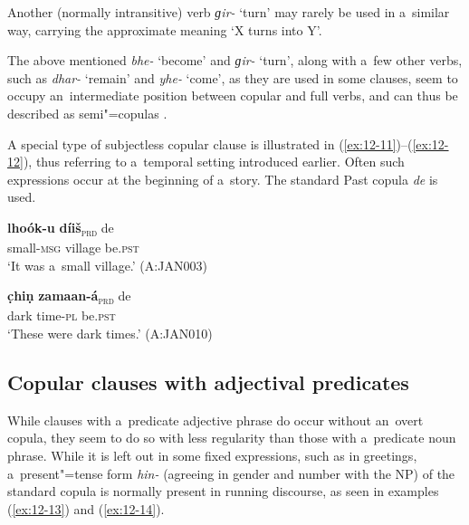 Another (normally intransitive) verb \textit{ɡir-} `turn' may rarely be used in a~similar way, carrying the approximate meaning `X turns into Y'.



The above mentioned \textit{bhe-} `become' and \textit{ɡir-} `turn', along with a~few other verbs, such as \textit{dhar-} `remain' and \textit{yhe-} `come', as they are used in some clauses, seem to occupy an~intermediate position between copular and full verbs, and can thus be described as semi"=copulas \citep[5--6]{pustet2003}. 



A special type of subjectless copular clause is illustrated in (\ref{ex:12-11})--(\ref{ex:12-12}), thus referring to a~temporal setting introduced earlier. Often such expressions occur at the beginning of a~story. The standard Past copula \textit{de} is used.

\begin{exe}
\ex
\label{ex:12-11}
\gll {\ob}\textbf{lhoók-u} \textbf{díiš}{\cb}\textsubscript{\textsc{\upshape prd}} de \\
small-\textsc{msg} village be.\textsc{pst} \\
\glt `It was a~small village.' (A:JAN003)
\end{exe}
\begin{exe}
\ex
\label{ex:12-12}
\gll {\ob}\textbf{c̣hiṇ} \textbf{zamaan-á}{\cb}\textsubscript{\textsc{\upshape prd}} de \\
dark time-\textsc{pl} be.\textsc{pst} \\
\glt `These were dark times.' (A:JAN010)
\end{exe}

\subsection{Copular clauses with adjectival predicates}
\label{subsec:12-1-2}


While clauses with a~predicate adjective phrase do occur without an~overt copula, they seem to do so with less regularity than those with a~predicate noun phrase. While it is left out in some fixed expressions, such as in greetings, a~present"=tense form \textit{hin-} (agreeing in gender and number with the NP) of the standard copula is normally present in running discourse, as seen in examples (\ref{ex:12-13}) and (\ref{ex:12-14}). 

